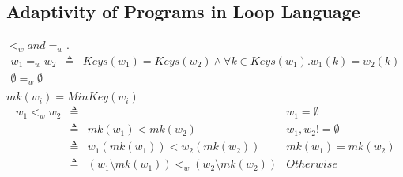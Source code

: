 \subsection{Adaptivity of Programs in Loop Language}
%
%
\begin{defn}
$<_w and =_w$.\\
\[
  \begin{array}{lll}
     w_1 =_w w_2  &  \triangleq &  Keys(w_1) = Keys(w_2) \land \forall k \in Keys(w_1). w_1(k) = w_2(k) \\
     \emptyset =_w \emptyset & &   \\
  \end{array}
\] 
$mk(w_i) =MinKey(w_i) $ 
\[
\begin{array}{lllr}
     w_1 <_w w_2 & \triangleq & & w_1 = \emptyset \\
     & \triangleq  & mk(w_1) < mk(w_2) & w_1,w_2 != \emptyset  \\
     & \triangleq & w_1(mk(w_1)) < w_2(mk(w_2))   & mk(w_1) = mk(w_2) \\
     & \triangleq & (w_1 \setminus mk(w_1) ) <_w (w_2 \setminus mk(w_2)) & Otherwise
\end{array}
\]
\end{defn}
%
%

